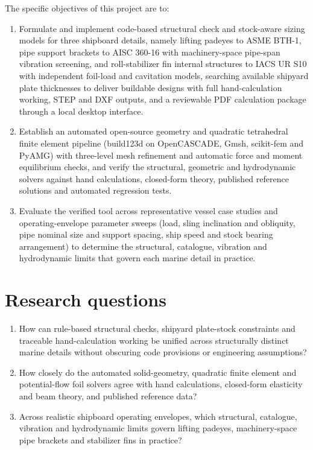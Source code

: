 The specific objectives of this project are to:
\begin{enumerate}
\item Formulate and implement code-based structural check and stock-aware sizing models for three shipboard details, namely lifting padeyes to ASME BTH-1, pipe support brackets to AISC 360-16 with machinery-space pipe-span vibration screening, and roll-stabilizer fin internal structures to IACS UR S10 with independent foil-load and cavitation models, searching available shipyard plate thicknesses to deliver buildable designs with full hand-calculation working, STEP and DXF outputs, and a reviewable PDF calculation package through a local desktop interface.
\item Establish an automated open-source geometry and quadratic tetrahedral finite element pipeline (build123d on OpenCASCADE, Gmsh, scikit-fem and PyAMG) with three-level mesh refinement and automatic force and moment equilibrium checks, and verify the structural, geometric and hydrodynamic solvers against hand calculations, closed-form theory, published reference solutions and automated regression tests.
\item Evaluate the verified tool across representative vessel case studies and operating-envelope parameter sweeps (load, sling inclination and obliquity, pipe nominal size and support spacing, ship speed and stock bearing arrangement) to determine the structural, catalogue, vibration and hydrodynamic limits that govern each marine detail in practice.
\end{enumerate}

\section{Research questions}
\label{sec:research-questions}

\begin{enumerate}
\item How can rule-based structural checks, shipyard plate-stock constraints and traceable hand-calculation working be unified across structurally distinct marine details without obscuring code provisions or engineering assumptions?
\item How closely do the automated solid-geometry, quadratic finite element and potential-flow foil solvers agree with hand calculations, closed-form elasticity and beam theory, and published reference data?
\item Across realistic shipboard operating envelopes, which structural, catalogue, vibration and hydrodynamic limits govern lifting padeyes, machinery-space pipe brackets and stabilizer fins in practice?
\end{enumerate}

